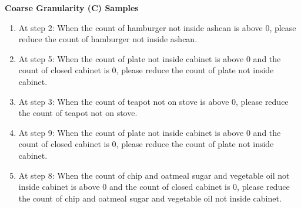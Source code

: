 \begin{table}[ht]
\begin{minipage}{\textwidth}
\noindent\textbf{Coarse Granularity (C) Samples}
\begin{tcolorbox}[colback=blue!5, colframe=blue!40!black]
\small
\begin{enumerate}
    \item At step 2: When the count of hamburger not inside ashcan is above 0, please reduce the count of hamburger not inside ashcan.
    \item At step 5: When the count of plate not inside cabinet is above 0 and the count of closed cabinet is 0, please reduce the count of plate not inside cabinet.
    \item At step 3: When the count of teapot not on stove is above 0, please reduce the count of teapot not on stove.
    \item At step 9: When the count of plate not inside cabinet is above 0 and the count of closed cabinet is 0, please reduce the count of plate not inside cabinet.
    \item At step 8: When the count of chip and oatmeal sugar and vegetable oil not inside cabinet is above 0 and the count of closed cabinet is 0, please reduce the count of chip and oatmeal sugar and vegetable oil not inside cabinet.
\end{enumerate}
\end{tcolorbox}

\end{minipage}
\caption{Sample generated instructions across granularity levels.}
\label{tab:sample_instructions}
\end{table}
